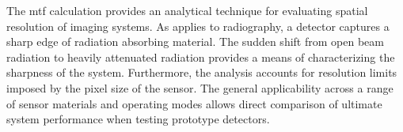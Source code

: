 \documentclass[../../../main.tex]{subfiles}
\begin{document}
%
    \Xsubsection%
    The \gls{mtf} calculation provides an analytical technique for evaluating spatial resolution of imaging systems.
    As applies to radiography, a detector captures a sharp edge of radiation absorbing material.
    The sudden shift from open beam radiation to heavily attenuated radiation provides a means of characterizing the sharpness of the system.
    Furthermore, the analysis accounts for resolution limits imposed by the pixel size of the sensor.
    The general applicability across a range of sensor materials and operating modes allows direct comparison of ultimate system performance when testing prototype detectors.
\end{document}
